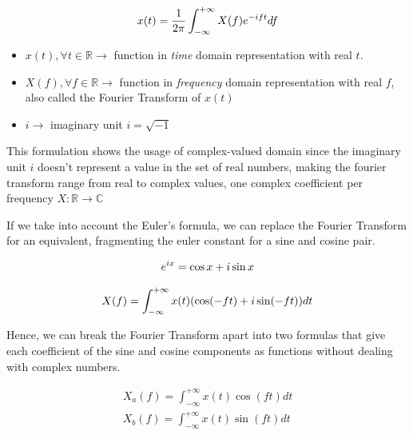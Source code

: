 \documentclass[
  oneside,
  11pt, a4paper,
  footinclude=true,
  headinclude=true,
  cleardoublepage=empty
]{scrbook}
\newcommand{\eqname}[1]{\tag*{#1}}%
\begin{document}
\begin{equation} \label{eq2}
        x(t) = \frac{1}{2\pi} \int_{-\infty}^{+\infty} X(f)e^{-i f t} df \\ %
\end{equation}

\begin{itemize}
    \item \( x(t), \forall t \in \mathbb{R} \rightarrow \) function in \textit{time} domain representation with real \( t \).
    \item \( X(f), \forall f \in \mathbb{R} \rightarrow \) function in \textit{frequency} domain representation with real \( f \), also called the Fourier Transform of \( x(t) \)
    \item \( i \rightarrow \) imaginary unit \( i = \sqrt{-1} \)
\end{itemize}

This formulation shows the usage of complex-valued domain since the imaginary unit \( i \) doesn't represent a value in the set of real numbers, making the fourier transform range from real to complex values, one complex coefficient per frequency \( X : \mathbb{R} \rightarrow \mathbb{C} \) 

If we take into account the Euler's formula, we can replace the Fourier Transform for an equivalent, fragmenting the euler constant for a sine and cosine pair.

\begin{equation} \label{euler_formula}
    e^{ix} = \cos x + i \sin x \\ %
\end{equation}

\begin{equation}
    X(f) = \int_{-\infty}^{+\infty} x(t) (\cos (-f t) + i \sin (-f t)) dt \\
\end{equation}

Hence, we can break the Fourier Transform apart into two formulas that give each coefficient of the sine and cosine components as functions without dealing with complex numbers.

\begin{equation}
    \begin{split}
        X_{a}(f) = \int_{-\infty}^{+\infty} x(t) \cos (f t) dt \\
        X_{b}(f) = \int_{-\infty}^{+\infty} x(t) \sin (f t) dt \\
    \end{split}
\end{equation}
\end{document}
